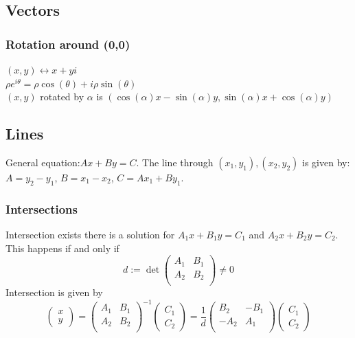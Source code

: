 \subsection{Vectors}
\subsubsection{Rotation around (0,0)}
$(x, y) \leftrightarrow x + y i$\\
$\rho e^{i\theta} = \rho \cos(\theta) + i \rho \sin(\theta)$\\

$(x, y)$ rotated by $\alpha$ is
$(\cos(\alpha) x - \sin(\alpha) y, \sin(\alpha)  x + \cos(\alpha) y)$



\subsection{Lines}
General equation:$Ax + By = C$. The line through $(x_1, y_1), (x_2, y_2)$ is given by: $A = y_2 - y_1$, $B = x_1 - x_2$, $C = A x_1 + B y_1$.

\subsubsection{Intersections}
Intersection exists there is a solution for $A_1 x + B_1 y = C_1$ and $A_2 x + B_2 y = C_2$. This happens if and only if $$d := \det \begin{pmatrix}
A_1 & B_1 \\
A_2 & B_2 \\
\end{pmatrix} \neq 0$$
Intersection is given by
$$\begin{pmatrix}
x\\
y
\end{pmatrix} = 
\begin{pmatrix}
A_1 & B_1 \\
A_2 & B_2 \\
\end{pmatrix}^{-1} 
\begin{pmatrix}
C_1 \\
C_2
\end{pmatrix}
=
\frac{1}{d}
\begin{pmatrix}
B_2 & -B_1 \\
-A_2 & A_1 \\
\end{pmatrix} 
\begin{pmatrix}
C_1 \\
C_2
\end{pmatrix}
$$

